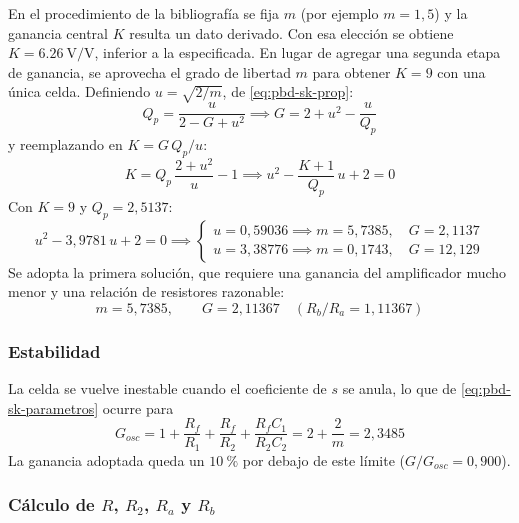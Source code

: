 En el procedimiento de la bibliografía se fija $m$ (por ejemplo $m = 1{,}5$) y la ganancia central $K$ resulta un
dato derivado. Con esa elección se obtiene $K = \SI{6.26}{\volt/\volt}$, inferior a la especificada. En lugar de
agregar una segunda etapa de ganancia, se aprovecha el grado de libertad $m$ para obtener $K = 9$ con una única celda.
Definiendo $u = \sqrt{2/m}$, de \eqref{eq:pbd-sk-prop}:
\begin{equation}
  Q_p = \frac{u}{2 - G + u^2} \implies G = 2 + u^2 - \frac{u}{Q_p}
  \label{eq:pbd-g}
\end{equation}
y reemplazando en $K = G\,Q_p / u$:
\begin{equation}
  K = Q_p\,\frac{2 + u^2}{u} - 1 \implies u^2 - \frac{K + 1}{Q_p}\,u + 2 = 0
  \label{eq:pbd-cuadratica}
\end{equation}
Con $K = 9$ y $Q_p = 2{,}5137$:
\begin{equation}
  u^2 - 3{,}9781\,u + 2 = 0 \implies
  \begin{cases}
    u = 0{,}59036 \implies m = 5{,}7385, \quad G = 2{,}1137 \\
    u = 3{,}38776 \implies m = 0{,}1743, \quad G = 12{,}129
  \end{cases}
\end{equation}
Se adopta la primera solución, que requiere una ganancia del amplificador mucho menor y una relación de resistores
razonable:
\begin{equation}
  m = 5{,}7385, \qquad G = 2{,}11367 \quad \left( R_b / R_a = 1{,}11367 \right)
  \label{eq:pbd-m-g}
\end{equation}

\subsubsection{Estabilidad}

La celda se vuelve inestable cuando el coeficiente de $s$ se anula, lo que de \eqref{eq:pbd-sk-parametros} ocurre
para
\begin{equation}
  G_{osc} = 1 + \frac{R_f}{R_1} + \frac{R_f}{R_2} + \frac{R_f C_1}{R_2 C_2} = 2 + \frac{2}{m} = 2{,}3485
\end{equation}
La ganancia adoptada queda un $\SI{10}{\percent}$ por debajo de este límite ($G / G_{osc} = 0{,}900$).

\subsubsection{Cálculo de $R$, $R_2$, $R_a$ y $R_b$}

